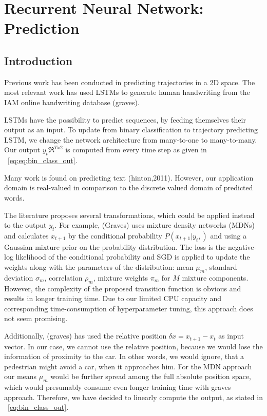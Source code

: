 
\section{Recurrent Neural Network: Prediction} \label{sec:rnn_pred}

\subsection{Introduction}
Previous work has been conducted in predicting trajectories in a 2D space. The most relevant work has used LSTMs to generate human handwriting from the IAM online handwriting database (graves).

LSTMs have the possibility to predict sequences, by feeding themselves their output as an input. To update from binary classification to trajectory predicting LSTM, we change the network architecture from many-to-one to many-to-many. Our output $y_t \Re^{Tx2}$ is computed from every time step as given in ~\cref{eq:eq:bin_class_out}. 

Many work is found on predicting text (hinton,2011). However, our application domain is real-valued in comparison to the discrete valued domain of predicted words.

The literature proposes several transformations, which could be applied instead to the output $y_t$. For example, (Graves) uses mixture density networks (MDNs) and calculates $x_{t+1}$ by the conditional probability $P(x_{t+1}|y_t, )$ and using a Gaussian mixture prior on the probability distribution. The loss is the negative-log likelihood of the conditional probability and SGD is applied to update the weights along with the parameters of the distribution: mean $\mu_m$, standard deviation $\sigma_m$, correlation $\rho_m$, mixture weights $\pi_m$ for $M$ mixture components. However, the complexity of the proposed transition function is obvious and results in longer training time. Due to our limited CPU capacity and corresponding time-consumption of hyperparameter tuning, this approach does not seem promising. 

Additionally, (graves) has used the relative position $\delta x = x_{t+1} - x_t$ as input vector. In our case, we cannot use the relative position, because we would lose the information of proximity to the car. In other words, we would ignore, that a pedestrian might avoid a car, when it approaches him. For the MDN approach our means $\mu_m$ would be further spread among the full absolute position space, which would presumably consume even longer training time with graves approach. Therefore, we have decided to linearly compute the output, as stated in ~\cref{eq:bin_class_out}. 

